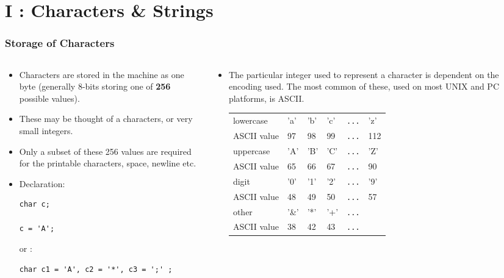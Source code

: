 \section{I : Characters \& Strings}
\label{chap:charstr}

\begin{frame}[fragile]
\frametitle{Storage of Characters}
\begin{columns}

\begin{column}{0.45\textwidth}
\begin{itemize}[<+->]
\item Characters are stored in the machine as one byte (generally $8$-bits storing one
of {\bf 256} possible values).
\item These may be thought of a characters, or very small integers.
\item Only a subset of these 256 values are required
for the printable characters, space, newline etc.
\item Declaration:
\begin{verbatim}
char c;

c = 'A';
\end{verbatim}
or :
\begin{verbatim}
char c1 = 'A', c2 = '*', c3 = ';' ;
\end{verbatim}
\end{itemize}
\end{column}

\pause
\begin{column}{0.45\textwidth}
\begin{itemize}[<+->]
\item The particular integer used to represent a character
is dependent on the encoding used. The most common
of these, used on most UNIX and PC platforms, is ASCII.

\begin{center}
\begin{tabular}{|l|lllll|}\hline
lowercase   & 'a' & 'b' & 'c' & \verb^...^ & 'z' \\
ASCII value & 97  &  98 &  99 & \verb^...^ & 112 \\ \hline
uppercase   & 'A' & 'B' & 'C' & \verb^...^ & 'Z' \\
ASCII value & 65  &  66 &  67 & \verb^...^ &  90 \\ \hline
digit       & '0' & '1' & '2' & \verb^...^ & '9' \\
ASCII value & 48  &  49 &  50 & \verb^...^ &  57 \\ \hline
other       & '\&' & '*' & '+' & \verb^...^ & \\
ASCII value & 38  &  42 &  43 & \verb^...^ & \\ \hline
\end{tabular}
\end{center}
\end{itemize}
\end{column}

\end{columns}
\end{frame}



